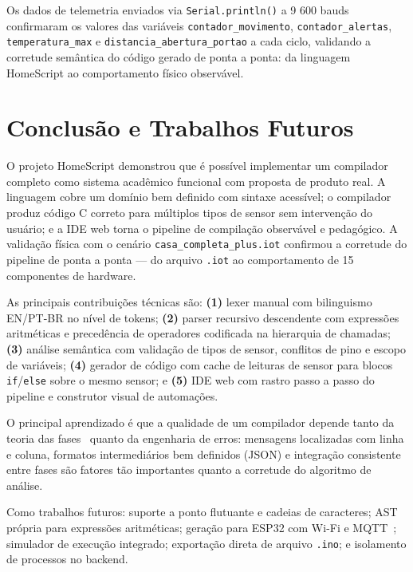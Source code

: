 \documentclass[conference]{IEEEtran}
\begin{document}
Os dados de telemetria enviados via \texttt{Serial.println()} a 9 600 bauds
confirmaram os valores das variáveis \texttt{contador\_movimento},
\texttt{contador\_alertas}, \texttt{temperatura\_max} e
\texttt{distancia\_abertura\_portao} a cada ciclo, validando a corretude
semântica do código gerado de ponta a ponta: da linguagem HomeScript ao
comportamento físico observável.

\section{Conclusão e Trabalhos Futuros}
\label{sec:conclusao}

O projeto HomeScript demonstrou que é possível implementar um compilador
completo como sistema acadêmico funcional com proposta de produto real. A
linguagem cobre um domínio bem definido com sintaxe acessível; o compilador
produz código C correto para múltiplos tipos de sensor sem intervenção do
usuário; e a IDE web torna o pipeline de compilação observável e pedagógico.
A validação física com o cenário \texttt{casa\_completa\_plus.iot} confirmou
a corretude do pipeline de ponta a ponta — do arquivo \texttt{.iot} ao
comportamento de 15 componentes de hardware.

As principais contribuições técnicas são: \textbf{(1)} lexer manual com
bilinguismo EN/PT-BR no nível de tokens; \textbf{(2)} parser recursivo
descendente com expressões aritméticas e precedência de operadores codificada
na hierarquia de chamadas; \textbf{(3)} análise semântica com validação de
tipos de sensor, conflitos de pino e escopo de variáveis;
\textbf{(4)} gerador de código com cache de leituras de sensor para blocos
\texttt{if}/\texttt{else} sobre o mesmo sensor; e \textbf{(5)} IDE web com
rastro passo a passo do pipeline e construtor visual de automações.

O principal aprendizado é que a qualidade de um compilador depende tanto da
teoria das fases~\cite{aho2006} quanto da engenharia de erros: mensagens
localizadas com linha e coluna, formatos intermediários bem definidos (JSON)
e integração consistente entre fases são fatores tão importantes quanto a
corretude do algoritmo de análise.

Como trabalhos futuros: suporte a ponto flutuante e cadeias de caracteres;
AST própria para expressões aritméticas; geração para ESP32 com Wi-Fi e
MQTT~\cite{mqtt2019}; simulador de execução integrado; exportação direta
de arquivo \texttt{.ino}; e isolamento de processos no backend.
\end{document}
